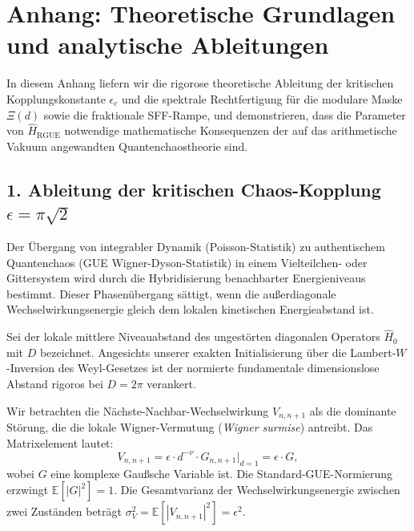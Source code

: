 \documentclass[aps,prl,preprint,superscriptaddress,floatfix]{revtex4-2}
\begin{document}
\appendix

\section{Anhang: Theoretische Grundlagen und analytische Ableitungen}
\label{app:theory}

In diesem Anhang liefern wir die rigorose theoretische Ableitung der kritischen Kopplungskonstante $\epsilon_c$ und die spektrale Rechtfertigung für die modulare Maske $\Xi(d)$ sowie die fraktionale SFF-Rampe, und demonstrieren, dass die Parameter von $\hat{H}_{\text{RGUE}}$ notwendige mathematische Konsequenzen der auf das arithmetische Vakuum angewandten Quantenchaostheorie sind.

\subsection{1. Ableitung der kritischen Chaos-Kopplung \texorpdfstring{$\epsilon = \pi\sqrt{2}$}{epsilon}}
Der Übergang von integrabler Dynamik (Poisson-Statistik) zu authentischem Quantenchaos (GUE Wigner-Dyson-Statistik) in einem Vielteilchen- oder Gittersystem wird durch die Hybridisierung benachbarter Energieniveaus bestimmt. Dieser Phasenübergang sättigt, wenn die außerdiagonale Wechselwirkungsenergie gleich dem lokalen kinetischen Energieabstand ist.

Sei der lokale mittlere Niveauabstand des ungestörten diagonalen Operators $\hat{H}_0$ mit $D$ bezeichnet. Angesichts unserer exakten Initialisierung über die Lambert-$W$-Inversion des Weyl-Gesetzes ist der normierte fundamentale dimensionslose Abstand rigoros bei $D = 2\pi$ verankert.

Wir betrachten die Nächste-Nachbar-Wechselwirkung $V_{n, n+1}$ als die dominante Störung, die die lokale Wigner-Vermutung (\textit{Wigner surmise}) antreibt. Das Matrixelement lautet:
\begin{equation}
V_{n, n+1} = \epsilon \cdot d^{-\nu} \cdot G_{n, n+1} \bigg|_{d=1} = \epsilon \cdot G,
\end{equation}
wobei $G$ eine komplexe Gaußsche Variable ist. Die Standard-GUE-Normierung erzwingt $\mathbb{E}[|G|^2] = 1$. Die Gesamtvarianz der Wechselwirkungsenergie zwischen zwei Zuständen beträgt $\sigma_V^2 = \mathbb{E}[|V_{n, n+1}|^2] = \epsilon^2$.
\end{document}
